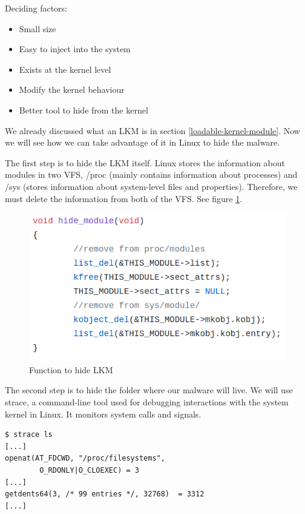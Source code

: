 \documentclass[11pt, a4paper,twoside]{tesi_upf}
\begin{document}
Deciding factors:
\begin{itemize}
    \item Small size
    \item Easy to inject into the system
    \item Exists at the kernel level
    \item Modify the kernel behaviour
    \item Better tool to hide from the kernel
\end{itemize}

We already discussed what an LKM is in section \ref{loadable-kernel-module}. Now we will see how we can take advantage of it in Linux to hide the malware.

The first step is to hide the LKM itself. Linux stores the information about modules in two VFS, /proc (mainly contains information about processes) and /sys (stores information about system-level files and properties). Therefore, we must delete the information from both of the VFS. See figure \ref{fig:hide-lkm}.

\begin{figure}
    \centering
    \includegraphics[width=\linewidth]{images/hide-lkm.png}
    \caption{Function to hide LKM}
    \label{fig:hide-lkm}
\end{figure}

The second step is to hide the folder where our malware will live. We will use strace, a command-line tool used for debugging interactions with the system kernel in Linux. It monitors system calls and signals.

\begin{lstlisting}
$ strace ls
[...]
openat(AT_FDCWD, "/proc/filesystems",
        O_RDONLY|O_CLOEXEC) = 3
[...]
getdents64(3, /* 99 entries */, 32768)  = 3312
[...]
\end{lstlisting}
\end{document}
